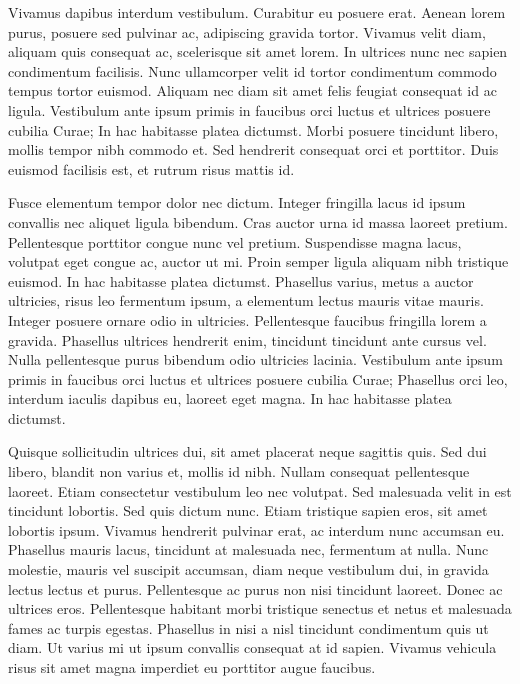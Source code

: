 \documentclass{EPUProjetDi}
\begin{document}
Vivamus dapibus interdum vestibulum. Curabitur eu posuere erat. Aenean lorem purus, posuere sed pulvinar ac, adipiscing gravida tortor. Vivamus velit diam, aliquam quis consequat ac, scelerisque sit amet lorem. In ultrices nunc nec sapien condimentum facilisis. Nunc ullamcorper velit id tortor condimentum commodo tempus tortor euismod. Aliquam nec diam sit amet felis feugiat consequat id ac ligula. Vestibulum ante ipsum primis in faucibus orci luctus et ultrices posuere cubilia Curae; In hac habitasse platea dictumst. Morbi posuere tincidunt libero, mollis tempor nibh commodo et. Sed hendrerit consequat orci et porttitor. Duis euismod facilisis est, et rutrum risus mattis id.

Fusce elementum tempor dolor nec dictum. Integer fringilla lacus id ipsum convallis nec aliquet ligula bibendum. Cras auctor urna id massa laoreet pretium. Pellentesque porttitor congue nunc vel pretium. Suspendisse magna lacus, volutpat eget congue ac, auctor ut mi. Proin semper ligula aliquam nibh tristique euismod. In hac habitasse platea dictumst. Phasellus varius, metus a auctor ultricies, risus leo fermentum ipsum, a elementum lectus mauris vitae mauris. Integer posuere ornare odio in ultricies. Pellentesque faucibus fringilla lorem a gravida. Phasellus ultrices hendrerit enim, tincidunt tincidunt ante cursus vel. Nulla pellentesque purus bibendum odio ultricies lacinia. Vestibulum ante ipsum primis in faucibus orci luctus et ultrices posuere cubilia Curae; Phasellus orci leo, interdum iaculis dapibus eu, laoreet eget magna. In hac habitasse platea dictumst.

Quisque sollicitudin ultrices dui, sit amet placerat neque sagittis quis. Sed dui libero, blandit non varius et, mollis id nibh. Nullam consequat pellentesque laoreet. Etiam consectetur vestibulum leo nec volutpat. Sed malesuada velit in est tincidunt lobortis. Sed quis dictum nunc. Etiam tristique sapien eros, sit amet lobortis ipsum. Vivamus hendrerit pulvinar erat, ac interdum nunc accumsan eu. Phasellus mauris lacus, tincidunt at malesuada nec, fermentum at nulla. Nunc molestie, mauris vel suscipit accumsan, diam neque vestibulum dui, in gravida lectus lectus et purus. Pellentesque ac purus non nisi tincidunt laoreet. Donec ac ultrices eros. Pellentesque habitant morbi tristique senectus et netus et malesuada fames ac turpis egestas. Phasellus in nisi a nisl tincidunt condimentum quis ut diam. Ut varius mi ut ipsum convallis consequat at id sapien. Vivamus vehicula risus sit amet magna imperdiet eu porttitor augue faucibus.
\end{document}
